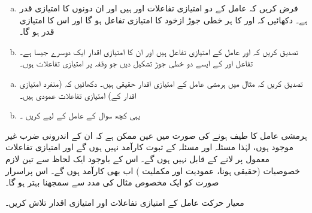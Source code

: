 \begin{enumerate}[a.]
\item
  فرض کریں کہ عامل  کے دو امتیازی تفاعلات   اور   ہیں اور ان دونوں کا امتیازی قدر  ہے۔  دکھائیں کہ  اور  کا ہر خطی جوڑ ازخود  کا امتیازی تفاعل ہو گا   اور اس  کا  امتیازی قدر  ہو گا۔
\item
 تصدیق کریں کہ  اور   عامل  کے امتیازی تفاعل ہیں اور ان کا امتیازی اقدار ایک دوسرے جیسا  ہے۔تفاعل    اور  کے ایسے دو خطی جوڑ تشکیل  دیں جو وقفہ  پر   امتیازی تفاعلات ہوں۔
\end{enumerate}
\begin{enumerate}[a.]
\item
 تصدیق کریں کہ مثال  میں ہرمشی عامل کے امتیازی اقدار حقیقی ہیں۔  دکھائیں کہ (منفرد امتیازی اقدار کے)  امتیازی تفاعلات عمودی ہیں۔ 
\item
 یہی کچھ سوال  کے عامل کے لیے کریں ۔
\end{enumerate}


ہرمشی عامل کا طیف     ہونے کی صورت میں عین ممکن ہے کہ ان کے  اندرونی ضرب  غیر موجود   ہوں،  لہٰذا مسئلہ    اور مسئلہ    کے ثبوت کارآمد نہیں ہوں گے  اور  امتیازی تفاعلات  معمول پر لانے کے قابل نہیں ہوں گے۔  اس کے باوجود ایک لحاظ سے  تین لازم خصوصیات (حقیقی ہونا، عمودیت اور مکملیت   ) اب بھی کارآمد ہوں گے۔    اس پراسرار    صورت کو ایک مخصوص مثال کی مدد سے سمجھنا بہتر ہو گا۔



معیار حرکت عامل کے امتیازی تفاعلات  اور امتیازی اقدار تلاش کریں۔

